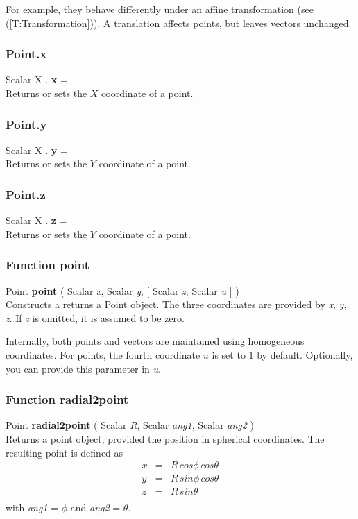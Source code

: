 \documentclass[10pt]{book}
\newcommand{\linkitem}[1]{\hyperref[#1]{\nameref{#1} (\ref{#1})}}
\newcommand{\var}[1]{\textit{#1}}
\begin{document}
For example, they behave differently under an affine transformation (see \linkitem{T:Transformation}). A translation affects points, but leaves vectors unchanged.

\subsubsection{Point.x \label{F:Point:x}}
Scalar X . \textbf{x} = \\
Returns or sets the $X$ coordinate of a point.

\subsubsection{Point.y \label{F:Point:y}}
Scalar X . \textbf{y} = \\
Returns or sets the $Y$ coordinate of a point.

\subsubsection{Point.z \label{F:Point:z}}
Scalar X . \textbf{z} = \\
Returns or sets the $Y$ coordinate of a point.

\subsubsection{Function point \label{F:point}}
Point \textbf{point} ( Scalar \textit{x}, Scalar \textit{y},  [ Scalar \textit{z}, Scalar \textit{u} ] ) \\
Constructs a returns a Point object. The three coordinates are provided by \var{x}, \var{y}, \var{z}. If \var{z} is omitted, it is assumed to be zero.


Internally, both points and vectors are maintained using homogeneous coordinates. For points, the fourth coordinate $u$ is set to $1$ by default. Optionally, you can provide this parameter in \var{u}.

\subsubsection{Function radial2point \label{F:radial2point}}
Point \textbf{radial2point} ( Scalar \textit{R}, Scalar \textit{ang1}, Scalar \textit{ang2} ) \\
Returns a point object, provided the position in spherical coordinates.
The resulting point is defined as
\begin{equation}
\begin{array}{rcl}
x &=& R \, cos \phi \, cos \theta \\
y &=& R \, sin \phi \, cos \theta \\
z &=& R \, sin \theta \\
\end{array}
\end{equation}
with \var{ang1} = $\phi$ and \var{ang2} = $\theta$.
\end{document}
